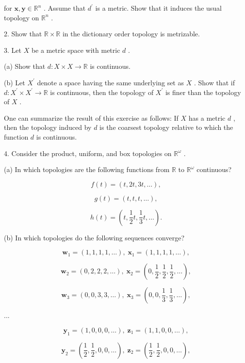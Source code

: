 \documentclass[10pt]{article}
\begin{document}
for \(\mathbf{x},\mathbf{y} \in  {\mathbb{R}}^{n}\) . Assume that \({d}^{\prime }\) is a metric. Show that it induces the usual topology on \({\mathbb{R}}^{n}\) .

2. Show that \(\mathbb{R} \times  \mathbb{R}\) in the dictionary order topology is metrizable.

3. Let \(X\) be a metric space with metric \(d\) .

(a) Show that \(d : X \times  X \rightarrow  \mathbb{R}\) is continuous.

(b) Let \({X}^{\prime }\) denote a space having the same underlying set as \(X\) . Show that if \(d : {X}^{\prime } \times  {X}^{\prime } \rightarrow  \mathbb{R}\) is continuous, then the topology of \({X}^{\prime }\) is finer than the topology of \(X\) .

One can summarize the result of this exercise as follows: If \(X\) has a metric \(d\) , then the topology induced by \(d\) is the coarsest topology relative to which the function \(d\) is continuous.

4. Consider the product, uniform, and box topologies on \({\mathbb{R}}^{\omega }\) .

(a) In which topologies are the following functions from \(\mathbb{R}\) to \({\mathbb{R}}^{\omega }\) continuous?

\[
f\left( t\right)  = \left( {t,{2t},{3t},\ldots }\right) ,
\]

\[
g\left( t\right)  = \left( {t,t,t,\ldots }\right) ,
\]

\[
h\left( t\right)  = \left( {t,\frac{1}{2}t,\frac{1}{3}t,\ldots }\right) .
\]

(b) In which topologies do the following sequences converge?

\[
{\mathbf{w}}_{1} = \left( {1,1,1,1,\ldots }\right) ,\;{\mathbf{x}}_{1} = \left( {1,1,1,1,\ldots }\right) ,
\]

\[
{\mathbf{w}}_{2} = \left( {0,2,2,2,\ldots }\right) ,\;{\mathbf{x}}_{2} = \left( {0,\frac{1}{2},\frac{1}{2},\frac{1}{2},\ldots }\right) ,
\]

\[
{\mathbf{w}}_{3} = \left( {0,0,3,3,\ldots }\right) ,\;{\mathbf{x}}_{3} = \left( {0,0,\frac{1}{3},\frac{1}{3},\ldots }\right) ,
\]

...

\[
{\mathbf{y}}_{1} = \left( {1,0,0,0,\ldots }\right) ,\;{\mathbf{z}}_{1} = \left( {1,1,0,0,\ldots }\right) ,
\]

\[
{\mathbf{y}}_{2} = \left( {\frac{1}{2},\frac{1}{2},0,0,\ldots }\right) ,\;{\mathbf{z}}_{2} = \left( {\frac{1}{2},\frac{1}{2},0,0,\ldots }\right) ,
\]
\end{document}
